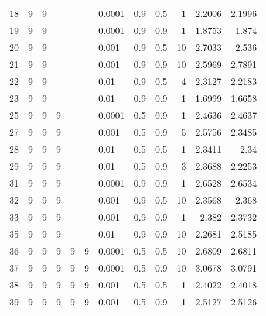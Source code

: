 \begin{longtable}{lrrrrrlrrrrr}
   18 &       9 & 9 &   &   &   &        0.0001 &      0.9 &    0.5 &       1 &     2.2006 &        2.1996 \\
   19 &       9 & 9 &   &   &   &        0.0001 &      0.9 &    0.9 &       1 &     1.8753 &         1.874 \\
   20 &       9 & 9 &   &   &   &         0.001 &      0.9 &    0.5 &      10 &     2.7033 &         2.536 \\
   21 &       9 & 9 &   &   &   &         0.001 &      0.9 &    0.9 &      10 &     2.5969 &        2.7891 \\
   22 &       9 & 9 &   &   &   &          0.01 &      0.9 &    0.5 &       4 &     2.3127 &        2.2183 \\
   23 &       9 & 9 &   &   &   &          0.01 &      0.9 &    0.9 &       1 &     1.6999 &        1.6658 \\
   25 &       9 & 9 & 9 &   &   &        0.0001 &      0.5 &    0.9 &       1 &     2.4636 &        2.4637 \\
   27 &       9 & 9 & 9 &   &   &         0.001 &      0.5 &    0.9 &       5 &     2.5756 &        2.3485 \\
   28 &       9 & 9 & 9 &   &   &          0.01 &      0.5 &    0.5 &       1 &     2.3411 &          2.34 \\
   29 &       9 & 9 & 9 &   &   &          0.01 &      0.5 &    0.9 &       3 &     2.3688 &        2.2253 \\
   31 &       9 & 9 & 9 &   &   &        0.0001 &      0.9 &    0.9 &       1 &     2.6528 &        2.6534 \\
   32 &       9 & 9 & 9 &   &   &         0.001 &      0.9 &    0.5 &      10 &     2.3568 &         2.368 \\
   33 &       9 & 9 & 9 &   &   &         0.001 &      0.9 &    0.9 &       1 &      2.382 &        2.3732 \\
   35 &       9 & 9 & 9 &   &   &          0.01 &      0.9 &    0.9 &      10 &     2.2681 &        2.5185 \\
   36 &       9 & 9 & 9 & 9 & 9 &        0.0001 &      0.5 &    0.5 &      10 &     2.6809 &        2.6811 \\
   37 &       9 & 9 & 9 & 9 & 9 &        0.0001 &      0.5 &    0.9 &      10 &     3.0678 &        3.0791 \\
   38 &       9 & 9 & 9 & 9 & 9 &         0.001 &      0.5 &    0.5 &       1 &     2.4022 &        2.4018 \\
   39 &       9 & 9 & 9 & 9 & 9 &         0.001 &      0.5 &    0.9 &       1 &     2.5127 &        2.5126 \\

\end{longtable}
